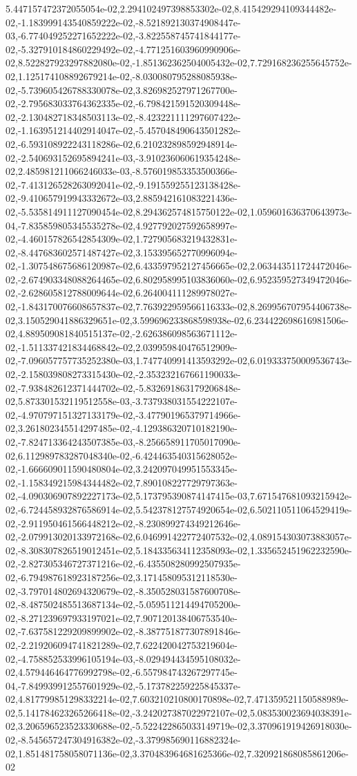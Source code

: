 5.447157472372055054e-02,2.294102497398853302e-02,8.415429294109344482e-02,-1.183999143540859222e-02,-8.521892130374908447e-03,-6.774049252271652222e-02,-3.822558745741844177e-02,-5.327910184860229492e-02,-4.771251603960990906e-02,8.522827923297882080e-02,-1.851362362504005432e-02,7.729168236255645752e-02,1.125174108892679214e-02,-8.030080795288085938e-02,-5.739605426788330078e-02,3.826982527971267700e-02,-2.795683033764362335e-02,-6.798421591520309448e-02,-2.130482718348503113e-02,-8.423221111297607422e-02,-1.163951214402914047e-02,-5.457048490643501282e-02,-6.593108922243118286e-02,6.210232898592948914e-02,-2.540693152695894241e-03,-3.910236060619354248e-02,2.485981211066246033e-03,-8.576019853353500366e-02,-7.413126528263092041e-02,-9.191559255123138428e-02,-9.410657919943332672e-03,2.885942161083221436e-02,-5.535814911127090454e-02,8.294362574815750122e-02,1.059601636370643973e-04,-7.835859805345535278e-02,4.927792027592658997e-02,-4.460157826542854309e-02,1.727905683219432831e-02,-8.447683602571487427e-02,3.153395652770996094e-02,-1.307548675686120987e-02,6.433597952127456665e-02,2.063443511724472046e-02,-2.674903348088264465e-02,6.802958995103836060e-02,6.952359527349472046e-02,-2.628605812788009644e-02,6.264004111289978027e-02,-1.843170076608657837e-02,7.763922959566116333e-02,8.269956707954406738e-02,3.150529041886329651e-02,3.599696233868598938e-02,6.234422698616981506e-02,4.889509081840515137e-02,-2.626386098563671112e-02,-1.511337421834468842e-02,2.039959840476512909e-02,-7.096057757735252380e-03,1.747740991413593292e-02,6.019333750009536743e-02,-2.158039808273315430e-02,-2.353232167661190033e-02,-7.938482612371444702e-02,-5.832691863179206848e-02,5.873301532119512558e-03,-3.737938031554222107e-02,-4.970797151327133179e-02,-3.477901965379714966e-02,3.261802345514297485e-02,-4.129386320710182190e-02,-7.824713364243507385e-03,-8.256658911705017090e-02,6.112989783287048340e-02,-6.424463540315628052e-02,-1.666609011590480804e-02,3.242097049951553345e-02,-1.158349215984344482e-02,7.890108227729797363e-02,-4.090306907892227173e-02,5.173795390874147415e-03,7.671547681093215942e-02,-6.724458932876586914e-02,5.542378127574920654e-02,6.502110511064529419e-02,-2.911950461566448212e-02,-8.230899274349212646e-02,-2.079913020133972168e-02,6.046991422772407532e-02,4.089154303073883057e-02,-8.308307826519012451e-02,5.184335634112358093e-02,1.335652451962232590e-02,-2.827305346727371216e-02,-6.435508280992507935e-02,-6.794987618923187256e-02,3.171458095312118530e-02,-3.797014802694320679e-02,-8.350528031587600708e-02,-8.487502485513687134e-02,-5.059511214494705200e-02,-8.271239697933197021e-02,7.907120138406753540e-02,-7.637581229209899902e-02,-8.387751877307891846e-02,-2.219206094741821289e-02,7.622420042753219604e-02,-4.758852533996105194e-03,-8.029494434595108032e-02,4.579446464776992798e-02,-6.557984743267297745e-04,-7.849939912557601929e-02,-5.173782259225845337e-02,4.817799851298332214e-02,7.603210210800170898e-02,7.471359521150588989e-02,5.141784623265266418e-02,-3.242027387022972107e-02,5.083530023694038391e-02,3.206596523523330688e-02,-5.522422865033149719e-02,3.370961919426918030e-02,-8.545657247304916382e-02,-3.379985690116882324e-02,1.851481758058071136e-02,3.370483964681625366e-02,7.320921868085861206e-02
